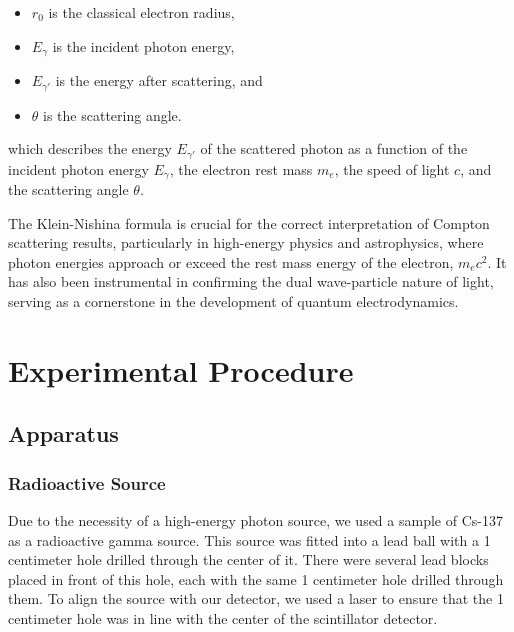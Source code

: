 \documentclass[10pt,letterpaper,onecolumn]{article}
\begin{document}
\begin{itemize}
    \item  $r_0$ is the classical electron radius, 
    \item $E_{\gamma}$ is the incident photon energy, 
    \item $E_{\gamma'}$ is the energy after scattering, and
    \item  $\theta$ is the scattering angle.
    \end{itemize}   
which describes the energy \( E_{\gamma'} \) of the scattered photon as a function of the incident photon energy \( E_{\gamma} \), the electron rest mass \( m_e \), the speed of light \( c \), and the scattering angle \( \theta \).


The Klein-Nishina formula is crucial for the correct interpretation of Compton scattering results, particularly in high-energy physics and astrophysics, where photon energies approach or exceed the rest mass energy of the electron, \( m_e c^2 \). It has also been instrumental in confirming the dual wave-particle nature of light, serving as a cornerstone in the development of quantum electrodynamics.

\section{Experimental Procedure}
\subsection{Apparatus}
\subsubsection{Radioactive Source}
Due to the necessity of a high-energy photon source, we used a sample of Cs-137 as a radioactive gamma source. This source was fitted into a lead ball with a 1 centimeter hole drilled through the center of it. There were several lead blocks placed in front of this hole, each with the same 1 centimeter hole drilled through them. To align the source with our detector, we used a laser to ensure that the 1 centimeter hole was in line with the center of the scintillator detector. 
\end{document}
